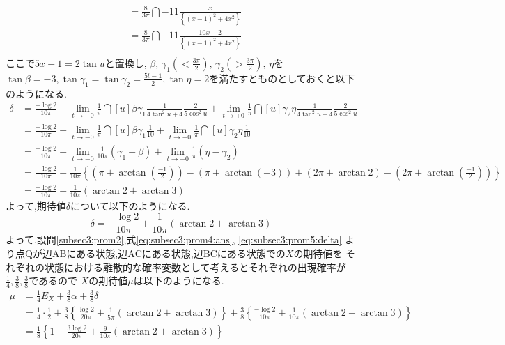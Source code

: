 \documentclass[dvipdfmx,titlepage, 11pt, a4paper]{jsarticle}%
\begin{document}
\begin{enumerate}[(1)]
\begin{align*}
          &= \frac{8}{3\pi}\dint{-1}{1}{\frac{x}{\left\{\left(x - 1\right)^2 + 4x^2\right\}}}\\
          &= \frac{8}{3\pi}\dint{-1}{1}{\frac{10x - 2}{\left\{\left(x - 1\right)^2 + 4x^2\right\}}}\\
  \end{align*}
  ここで$5x - 1 = 2\tan u$と置換し, $\beta,\, \gamma_1(< \frac{3\pi}{2}),\, \gamma_2(> \frac{3\pi}{2}),\, \eta$を$\tan\beta = -3, \tan\gamma_1 = \tan\gamma_2 = \frac{5t - 1}{2}, \tan\eta = 2$を満たすとものとしておくと以下のようになる.
  \begin{align*}
    \delta 
    &= \frac{-\log 2}{10\pi} + \lim_{t \to -0}\frac{1}{\pi}\dint[u]{\beta}{\gamma_1}{\frac{1}{4\tan^{2}u + 4}\frac{2}{5\cos^{2}u}}
      + \lim_{t \to +0}\frac{1}{\pi}\dint[u]{\gamma_2}{\eta}{\frac{1}{4\tan^{2}u + 4}\frac{2}{5\cos^{2}u}}\\
    &= \frac{-\log 2}{10\pi} + \lim_{t \to -0}\frac{1}{\pi}\dint[u]{\beta}{\gamma_1}{\frac{1}{10}} 
      + \lim_{t \to +0}\frac{1}{\pi}\dint[u]{\gamma_2}{\eta}{\frac{1}{10}}\\
    &= \frac{-\log 2}{10\pi} + \lim_{t \to -0}\frac{1}{10\pi}(\gamma_1 - \beta) + \lim_{t \to -0}\frac{1}{\pi}(\eta - \gamma_2)\\
    &= \frac{-\log 2}{10\pi} + \frac{1}{10\pi}\left\{\left(\pi + \arctan\left(\frac{-1}{2}\right)\right) - (\pi + \arctan(-3))
      + (2\pi + \arctan 2) - \left(2\pi + \arctan\left(\frac{-1}{2}\right)\right)\right\}\\
    &= \frac{-\log 2}{10\pi} + \frac{1}{10\pi}(\arctan 2 + \arctan 3)
  \end{align*}
  よって,期待値$\delta$について以下のようになる.
  \begin{equation}
    \delta = \frac{-\log 2}{10\pi} + \frac{1}{10\pi}(\arctan 2 + \arctan 3)\label{eq:subsec3:prom5:delta}
  \end{equation}
  よって,設問\eqref{subsec3:prom2},式\eqref{eq:subsec3:prom4:ans}, \eqref{eq:subsec3:prom5:delta}
  より点$\mathrm{Q}$が辺$\mathrm{AB}$にある状態,辺$\mathrm{AC}$にある状態,辺$\mathrm{BC}$にある状態での$X$の期待値を
  それぞれの状態における離散的な確率変数として考えるとそれぞれの出現確率が$\frac{1}{4}, \frac{3}{8}, \frac{3}{8}$であるので
  $X$の期待値$\mu$は以下のようになる.
  \begin{align*}
    \mu &= \frac{1}{4}E_{X} + \frac{3}{8}\alpha + \frac{3}{8}\delta\\
        &= \frac{1}{4}\cdot\frac{1}{2} 
          + \frac{3}{8}\left\{\frac{\log 2}{20\pi} + \frac{1}{5\pi}(\arctan 2 + \arctan 3)\right\}
          + \frac{3}{8}\left\{\frac{-\log 2}{10\pi} + \frac{1}{10\pi}(\arctan 2 + \arctan 3)\right\}\\
        &= \frac{1}{8}\left\{1 - \frac{3\log 2}{20\pi} + \frac{9}{10\pi}(\arctan 2 + \arctan 3)\right\}
  \end{align*}
\end{enumerate}
\end{document}
